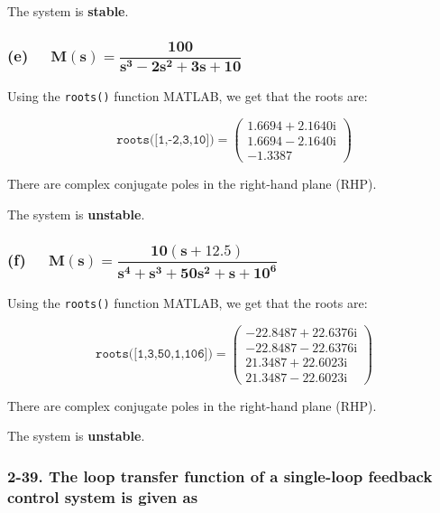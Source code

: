 \documentclass[12pt, letterpaper]{../assignment}
\begin{document}
\begin{answer}
    The system is \textbf{stable}.
\end{answer}

\subsubsection*{(e) \ \ $ \mathbf{ M(s) = \dfrac{100}{s^3 - 2s^2 + 3s + 10}}$}

Using the \texttt{roots()} function MATLAB, we get that the roots are:

$$ \texttt{roots([1,-2,3,10])} = \left(\begin{array}{c} 1.6694+2.1640{}\mathrm{i}\\ 1.6694-2.1640{}\mathrm{i}\\ -1.3387 \end{array}\right)$$

There are complex conjugate poles in the right-hand plane (RHP).

\begin{answer}
    The system is \textbf{unstable}.
\end{answer}


\subsubsection*{(f) \ \ $ \mathbf{ M(s) = \dfrac{10(s + 12.5)}{s^4 + s^3 + 50s^2 + s + 10^6}}$}

Using the \texttt{roots()} function MATLAB, we get that the roots are:

$$ \texttt{roots([1,3,50,1,10\^{}6])} = \left(\begin{array}{c} -22.8487+22.6376{}\mathrm{i}\\ -22.8487-22.6376{}\mathrm{i}\\ 21.3487+22.6023{}\mathrm{i}\\ 21.3487-22.6023{}\mathrm{i} \end{array}\right)$$

There are complex conjugate poles in the right-hand plane (RHP).

\begin{answer}
The system is \textbf{unstable}.
\end{answer}


\subsubsection*{2-39. The loop transfer function of a single-loop feedback control system is given as}
\end{document}
